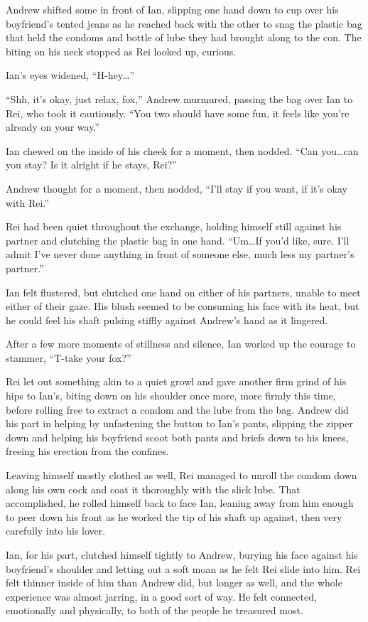 Andrew shifted some in front of Ian, slipping one hand down to cup over his boyfriend's tented jeans as he reached back with the other to snag the plastic bag that held the condoms and bottle of lube they had brought along to the con. The biting on his neck stopped as Rei looked up, curious.

Ian's eyes widened, ``H-hey\ldots{}''

``Shh, it's okay, just relax, fox,'' Andrew murmured, passing the bag over Ian to Rei, who took it cautiously. ``You two should have some fun, it feels like you're already on your way.''

Ian chewed on the inside of his cheek for a moment, then nodded. ``Can you\ldots{}can you stay? Is it alright if he stays, Rei?''

Andrew thought for a moment, then nodded, ``I'll stay if you want, if it's okay with Rei.''

Rei had been quiet throughout the exchange, holding himself still against his partner and clutching the plastic bag in one hand. ``Um\ldots{}If you'd like, sure. I'll admit I've never done anything in front of someone else, much less my partner's partner.''

Ian felt flustered, but clutched one hand on either of his partners, unable to meet either of their gaze. His blush seemed to be consuming his face with its heat, but he could feel his shaft pulsing stiffly against Andrew's hand as it lingered.

After a few more moments of stillness and silence, Ian worked up the courage to stammer, ``T-take your fox?''

Rei let out something akin to a quiet growl and gave another firm grind of his hips to Ian's, biting down on his shoulder once more, more firmly this time, before rolling free to extract a condom and the lube from the bag. Andrew did his part in helping by unfastening the button to Ian's pants, slipping the zipper down and helping his boyfriend scoot both pants and briefs down to his knees, freeing his erection from the confines.

Leaving himself mostly clothed as well, Rei managed to unroll the condom down along his own cock and coat it thoroughly with the slick lube. That accomplished, he rolled himself back to face Ian, leaning away from him enough to peer down his front as he worked the tip of his shaft up against, then very carefully into his lover.

Ian, for his part, clutched himself tightly to Andrew, burying his face against his boyfriend's shoulder and letting out a soft moan as he felt Rei slide into him. Rei felt thinner inside of him than Andrew did, but longer as well, and the whole experience was almost jarring, in a good sort of way. He felt connected, emotionally and physically, to both of the people he treasured most.

